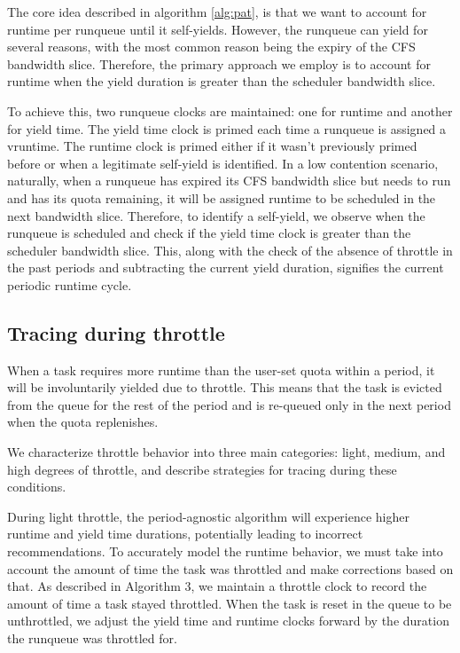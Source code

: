 The core idea described in algorithm \ref{alg:pat}, is that we want to account for runtime per runqueue until it self-yields. However, the runqueue can yield for several reasons, with the most common reason being the expiry of the CFS bandwidth slice. Therefore, the primary approach we employ is to account for runtime when the yield duration is greater than the scheduler bandwidth slice.

To achieve this, two runqueue clocks are maintained: one for runtime and another for yield time. The yield time clock is primed each time a runqueue is assigned a vruntime. The runtime clock is primed either if it wasn't previously primed before or when a legitimate self-yield is identified. In a low contention scenario, naturally, when a runqueue has expired its CFS bandwidth slice but needs to run and has its quota remaining, it will be assigned runtime to be scheduled in the next bandwidth slice. Therefore, to identify a self-yield, we observe when the runqueue is scheduled and check if the yield time clock is greater than the scheduler bandwidth slice. This, along with the check of the absence of throttle in the past periods and subtracting the current yield duration, signifies the current periodic runtime cycle.

\subsection{Tracing during throttle}
\label{sec:throttle_tracing}
When a task requires more runtime than the user-set quota within a period, it will be involuntarily yielded due to throttle. This means that the task is evicted from the queue for the rest of the period and is re-queued only in the next period when the quota replenishes.

We characterize throttle behavior into three main categories: light, medium, and high degrees of throttle, and describe strategies for tracing during these conditions.

During light throttle, the period-agnostic algorithm will experience higher runtime and yield time durations, potentially leading to incorrect recommendations. To accurately model the runtime behavior, we must take into account the amount of time the task was throttled and make corrections based on that. As described in Algorithm 3, we maintain a throttle clock to record the amount of time a task stayed throttled. When the task is reset in the queue to be unthrottled, we adjust the yield time and runtime clocks forward by the duration the runqueue was throttled for.

